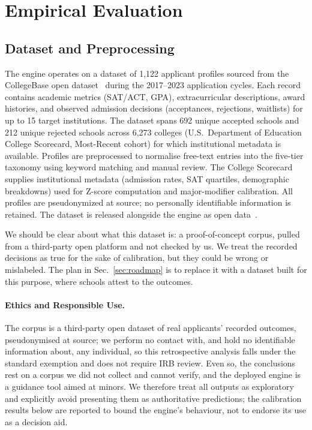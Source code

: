\documentclass[conference]{IEEEtran}
\begin{document}
\section{Empirical Evaluation}
\label{sec:eval}
\subsection{Dataset and Preprocessing}
The engine operates on a dataset of 1,122 applicant profiles sourced from the CollegeBase open dataset~\cite{collegebase} during the 2017--2023 application cycles. Each record contains academic metrics (SAT/ACT, GPA), extracurricular descriptions, award histories, and observed admission decisions (acceptances, rejections, waitlists) for up to 15 target institutions. The dataset spans 692 unique accepted schools and 212 unique rejected schools across 6,273 colleges (U.S.\ Department of Education College Scorecard, Most-Recent cohort) for which institutional metadata is available. Profiles are preprocessed to normalise free-text entries into the five-tier taxonomy using keyword matching and manual review. The College Scorecard~\cite{scorecard} supplies institutional metadata (admission rates, SAT quartiles, demographic breakdowns) used for Z-score computation and major-modifier calibration. All profiles are pseudonymized at source; no personally identifiable information is retained. The dataset is released alongside the engine as open data~\cite{admitgpt}.

We should be clear about what this dataset is: a proof-of-concept corpus, pulled from a third-party open platform and not checked by us. We treat the recorded decisions as true for the sake of calibration, but they could be wrong or mislabeled. The plan in Sec.~\ref{sec:roadmap} is to replace it with a dataset built for this purpose, where schools attest to the outcomes.

\paragraph{Ethics and Responsible Use.}
The corpus is a third-party open dataset of real applicants' recorded outcomes, pseudonymised at source; we perform no contact with, and hold no identifiable information about, any individual, so this retrospective analysis falls under the standard exemption and does not require IRB review. Even so, the conclusions rest on a corpus we did not collect and cannot verify, and the deployed engine is a guidance tool aimed at minors. We therefore treat all outputs as exploratory and explicitly avoid presenting them as authoritative predictions; the calibration results below are reported to bound the engine's behaviour, not to endorse its use as a decision aid.
\end{document}
